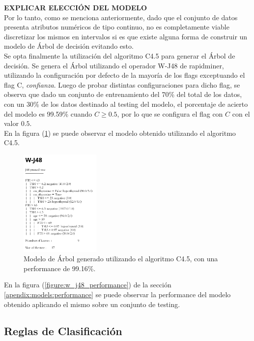 \documentclass[osajnl,twocolumn,showpacs,superscriptaddress,10pt,floatfix]{revtex4-1} %
\begin{document}
\textbf{EXPLICAR ELECCIÓN DEL MODELO} \\

Por lo tanto, como se menciona anteriormente, dado que el conjunto de datos presenta atributos numéricos de tipo continuo, no es completamente viable discretizar los mismos en intervalos si es que existe alguna forma de construir un modelo de Árbol de decisión evitando esto. \\

Se opta finalmente la utilización del algoritmo C4.5 para generar el Árbol de decisión. Se genera el Árbol utilizando el operador W-J48 de rapidminer, utilizando la configuración por defecto de la mayoría de los flags exceptuando el flag C, \textit{confianza}. Luego de probar distintas configuraciones para dicho flag, se observa que dado un conjunto de entrenamiento del 70\% del total de los datos, con un 30\% de los datos destinado al testing del modelo, el porcentaje de acierto del modelo es 99.59\% cuando $C \geq 0.5$, por lo que se configura el flag con $C$ con el valor $0.5$. \\

En la figura (\ref{figure:w_j48}) se puede observar el modelo obtenido utilizando el algoritmo C4.5.

\begin{figure}[H]
    \centering
    \includegraphics[width=0.35\textwidth]{models/w_j48}
    \caption{Modelo de Árbol generado utilizando el algoritmo C4.5, con una performance de 99.16\%.}
    \label{figure:w_j48}
\end{figure}

En la figura (\ref{figure:w_j48_performance}) de la sección \ref{apendix:models:performance} se puede observar la performance del modelo obtenido aplicando el mismo sobre un conjunto de testing. \\

\subsection{Reglas de Clasificación}
\end{document}
